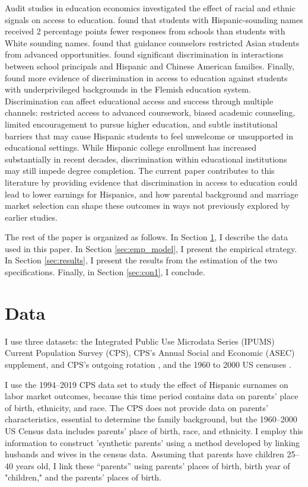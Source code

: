 Audit studies in education economics investigated the effect of racial and ethnic signals on access to education. \textcite{bergman2018education} found that students with Hispanic-sounding names received 2 percentage points fewer responses from schools than students with White sounding names. \textcite{janssen2022guidance} found that guidance counselors restricted Asian students from advanced opportunities. \textcite{gaddis2024racial} found significant discrimination in interactions between school principals and Hispanic and Chinese American families. Finally, \textcite{bourabain2023school} found more evidence of discrimination in access to education against students with underprivileged backgrounds in the Flemish education system. Discrimination can affect educational access and success through multiple channels: restricted access to advanced coursework, biased academic counseling, limited encouragement to pursue higher education, and subtle institutional barriers that may cause Hispanic students to feel unwelcome or unsupported in educational settings. While Hispanic college enrollment has increased substantially in recent decades, discrimination within educational institutions may still impede degree completion. The current paper contributes to this literature by providing evidence that discrimination in access to education could lead to lower earnings for Hispanics, and how parental background and marriage market selection can shape these outcomes in ways not previously explored by earlier studies.

The rest of the paper is organized as follows. In Section \ref{sec:data}, I describe the data used in this paper. In Section \ref{sec:emp_model}, I present the empirical strategy. In Section \ref{sec:results}, I present the results from the estimation of the two specifications. Finally, in Section \ref{sec:con1}, I conclude.

\section{Data}\label{sec:data}

I use three datasets: the Integrated Public Use Microdata Series (IPUMS) Current Population Survey (CPS), CPS's Annual Social and Economic (ASEC) supplement, and CPS's outgoing rotation \autocite{cps2019}, and the 1960 to 2000 US censuses \autocite{acs2019}. 

I use the 1994–2019 CPS data set to study the effect of Hispanic surnames on labor market outcomes, because this time period contains data on parents’ place of birth, ethnicity, and race. The CPS does not provide data on parents’ characteristics, essential to determine the family background, but the 1960–2000 US Census data includes parents’ place of birth, race, and ethnicity. I employ this information to construct 'synthetic parents' using a method developed by \textcite{rubinstein2014pride} linking husbands and wives  in the census data. Assuming that parents have children 25–40 years old, I link these “parents” using parents’ places of birth, birth year of "children," and the parents’ places of birth.

